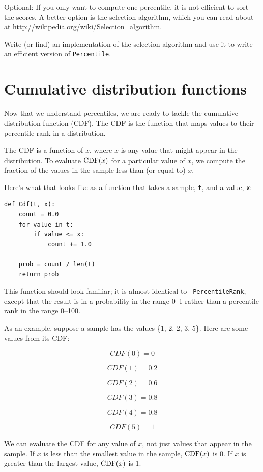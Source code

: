 \documentclass[12pt]{book}
\begin{document}
\begin{exercise}
Optional: If you only want to compute one percentile, it is not
efficient to sort the scores.  A better option is the selection
algorithm, which you can read about at
\url{http://wikipedia.org/wiki/Selection_algorithm}.

Write (or find) an implementation of the selection algorithm and use
it to write an efficient version of {\tt Percentile}.

\end{exercise}


\section{Cumulative distribution functions}

Now that we understand percentiles, we are ready to tackle the
cumulative distribution function (CDF).  The CDF is the function that
maps values to their percentile rank in a distribution.

The CDF is a function of $x$, where $x$ is any value that might appear
in the distribution.  To evaluate $\mathrm{CDF}(x)$ for a particular value of
$x$, we compute the fraction of the values in the sample less than (or
equal to) $x$.

Here's what that looks like as a function that takes a sample,
{\tt t}, and a value, {\tt x}:
%
\begin{verbatim}
def Cdf(t, x):
    count = 0.0
    for value in t:
        if value <= x:
            count += 1.0

    prob = count / len(t)
    return prob
\end{verbatim}

This function should look familiar; it is almost identical to {\tt
  PercentileRank}, except that the result is in a probability in the
range 0--1 rather than a percentile rank in the range 0--100.

As an example, suppose a sample has the values \{1, 2, 2, 3, 5\}.
Here are some values from its CDF:

\[ CDF(0) = 0 \]

\[ CDF(1) = 0.2\]

\[ CDF(2) = 0.6\]

\[ CDF(3) = 0.8\]

\[ CDF(4) = 0.8\]

\[ CDF(5) = 1\]

We can evaluate the CDF for any value of $x$, not just
values that appear in the sample.
If $x$ is less than the smallest value in the sample, $\mathrm{CDF}(x)$ is 0.
If $x$ is greater than the largest value, $\mathrm{CDF}(x)$ is 1.
\end{document}
